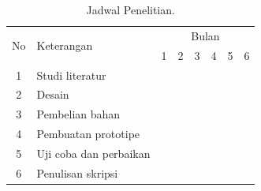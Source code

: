 		\begin{table}[H]
		\centering
		\caption{Jadwal Penelitian.}
		\label{jadwal}
		\begin{tabular}{|c|l|l|l|l|l|l|l|}
		\hline
		\multirow{2}{*}{No} & \multirow{2}{*}{Keterangan} & \multicolumn{6}{c|}{Bulan}                                                                                                                          \\ \cline{3-8} 
		                    &                             & 1 & 2 & 3 & 4 & 5 & 6 \\ \hline
		1                   & Studi literatur                                  &\cellcolor{gray} &\cellcolor{gray}&                        &                        &                        &                         \\ \hline
		2                   & Desain                                           &                        &\cellcolor{gray}&\cellcolor{gray}&                        &                        &                         \\ \hline
		3                   & Pembelian bahan                                  &                        &                        &\cellcolor{gray}&                        &                        &                         \\ \hline
		4                   & Pembuatan prototipe                              &                        &                        &\cellcolor{gray}&\cellcolor{gray}&\cellcolor{gray}&                         \\ \hline
		5                   & Uji coba dan perbaikan                           &                        &                        &                        &\cellcolor{gray}&\cellcolor{gray}&                         \\ \hline
		6                   & Penulisan skripsi                                &                        &                        &                        &                        &                        &\cellcolor{gray}\\ \hline
		\end{tabular}
		\end{table}
	

